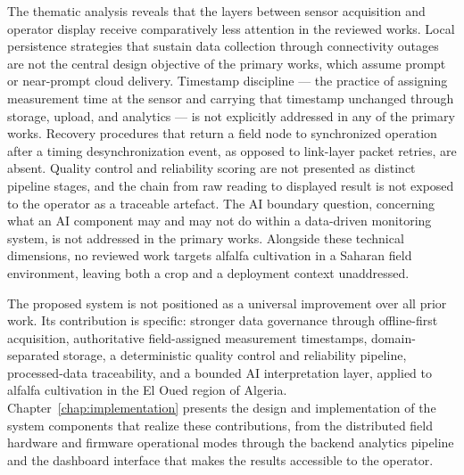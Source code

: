The thematic analysis reveals that the layers between sensor acquisition and
operator display receive comparatively less attention in the reviewed works.
Local persistence strategies that sustain data collection through connectivity
outages are not the central design objective of the primary works, which assume
prompt or near-prompt cloud delivery. Timestamp discipline --- the practice of
assigning measurement time at the sensor and carrying that timestamp
unchanged through storage, upload, and analytics --- is not explicitly
addressed in any of the primary works. Recovery procedures that return a field
node to synchronized operation after a timing desynchronization event, as
opposed to link-layer packet retries, are absent. Quality control and
reliability scoring are not presented as distinct pipeline stages, and the
chain from raw reading to displayed result is not exposed to the operator as
a traceable artefact. The AI boundary question, concerning what an AI component
may and may not do within a data-driven monitoring system, is not addressed in
the primary works. Alongside these technical dimensions, no reviewed work
targets alfalfa cultivation in a Saharan field environment, leaving both a crop
and a deployment context unaddressed.

The proposed system is not positioned as a universal improvement over all prior
work. Its contribution is specific: stronger data governance through
offline-first acquisition, authoritative field-assigned measurement timestamps,
domain-separated storage, a deterministic quality control and reliability
pipeline, processed-data traceability, and a bounded AI interpretation layer,
applied to alfalfa cultivation in the El Oued region of Algeria. Chapter~\ref{chap:implementation}
presents the design and implementation of the system components that realize
these contributions, from the distributed field hardware and firmware
operational modes through the backend analytics pipeline and the dashboard
interface that makes the results accessible to the operator.

